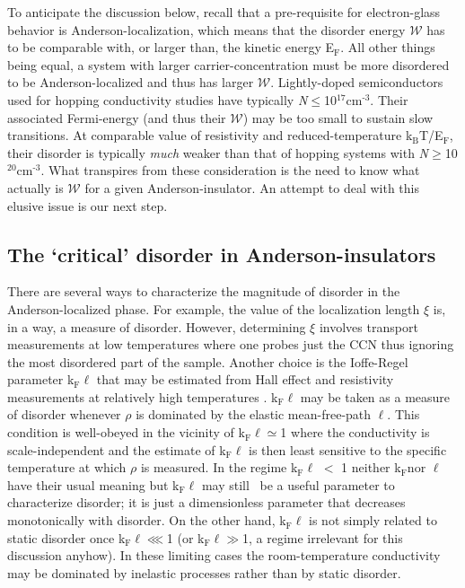 \documentclass
[preprint,showpacs,byrevtex,10pt,twocolumn,tightenlines,prl,letterpaper]{revtex4}%
\begin{document}
To anticipate the discussion below, recall that a pre-requisite for
electron-glass behavior is Anderson-localization, which means that the
disorder energy $\mathcal{W}$ has to be comparable with, or larger than, the
kinetic energy E$_{\text{F}}$. All other things being equal, a system with
larger carrier-concentration must be more disordered to be Anderson-localized
and thus has larger $\mathcal{W}$. Lightly-doped semiconductors used for
hopping conductivity studies have typically \textit{N}$\leq$10$^{\text{17}}%
$cm$^{\text{-3}}$. Their associated Fermi-energy (and thus their $\mathcal{W}%
$) may be too small to sustain slow transitions. At comparable value of
resistivity and reduced-temperature k$_{\text{B}}$T/E$_{\text{F}}$, their
disorder is typically \textit{much} weaker than that of hopping systems with
\textit{N{}{}}$\geq$10$^{\text{20}}$cm$^{\text{-3}}$. What transpires from
these consideration is the need to know what actually is $\mathcal{W}$ for a
given Anderson-insulator. An attempt to deal with this elusive issue is our
next step.

\subsection{The `critical' disorder in Anderson-insulators}

There are several ways to characterize the magnitude of disorder in the
Anderson-localized phase. For example, the value of the localization length
$\xi$ is, in a way, a measure of disorder. However, determining $\xi$ involves
transport measurements at low temperatures where one probes just the CCN thus
ignoring the most disordered part of the sample. Another choice is the
Ioffe-Regel parameter k$_{\text{F}}\ell$ that may be estimated from Hall
effect and resistivity measurements at relatively high temperatures \cite{46}.
k$_{\text{F}}\ell$ may be taken as a measure of disorder whenever $\rho$ is
dominated by the elastic mean-free-path $\ell$. This condition is well-obeyed
in the vicinity of k$_{\text{F}}\ell\simeq$1 where the conductivity is
scale-independent \cite{47} and the estimate of k$_{\text{F}}\ell$ is then
least sensitive to the specific temperature at which $\rho$ is measured.
{\small I}n the regime k$_{\text{F}}\ell$%
$<$%
1 neither k$_{\text{F}}$nor $\ell$ have their usual meaning but k$_{\text{F}%
}\ell$ may still \ be a useful parameter to characterize disorder; it is just
a dimensionless parameter that decreases monotonically with disorder. On the
other hand, k$_{\text{F}}\ell$ is not simply related to static disorder once
k$_{\text{F}}\ell\lll$1 (or k$_{\text{F}}\ell\gg$1, a regime irrelevant for
this discussion anyhow). In these limiting cases the room-temperature
conductivity may be dominated by inelastic processes rather than by static disorder.
\end{document}
